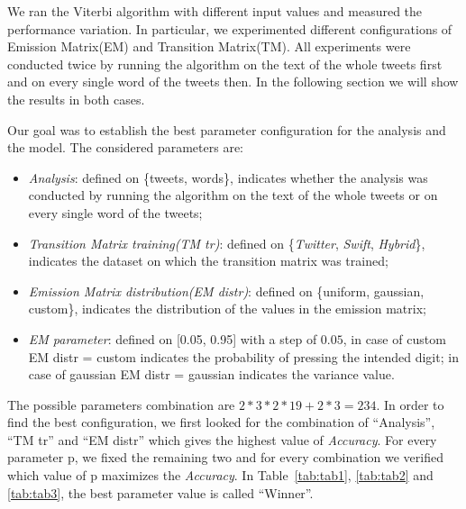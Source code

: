\documentclass[12pt]{article}
\begin{document}
We ran the Viterbi algorithm with different input values and measured the performance variation. In particular, we experimented different configurations
of Emission Matrix(EM) and Transition Matrix(TM). All experiments were conducted
twice by running the algorithm on the text of the whole tweets first and on
every single word of the tweets then. In the following section we will show the
results in both cases.

Our goal was to establish the best parameter configuration for the analysis and
the model. 
The considered parameters are: 
\begin{itemize}
  \item \emph{Analysis}: defined on \{tweets, words\}, indicates whether the
  analysis was conducted by running the algorithm on the text of the whole
  tweets or on every single word of the tweets;
  \item \emph{Transition Matrix training(TM tr)}: defined on \{\emph{Twitter},
  \emph{Swift}, \emph{Hybrid}\}, indicates the dataset on which the transition
  matrix was trained;
  \item \emph{Emission Matrix distribution(EM distr)}: defined on \{uniform,
  gaussian, custom\}, indicates the distribution of the values in the emission
  matrix;
  \item \emph{EM parameter}: defined on [0.05, 0.95] with a step of $0.05$,
  in case of custom EM distr = custom indicates the probability of pressing the
  intended digit; in case of gaussian EM distr = gaussian indicates the variance value.
\end{itemize}
The possible parameters combination are $2 * 3 * 2 * 19 + 2 * 3 = 234$. In order
to find the best configuration, we first looked for the combination of
``Analysis'', ``TM tr'' and ``EM  distr'' which gives the highest value of
\emph{Accuracy}. For every parameter p, we fixed the remaining two and for every
combination we verified which value of p maximizes the \emph{Accuracy}. In
Table~\ref{tab:tab1}, \ref{tab:tab2} and \ref{tab:tab3}, the best parameter value is called ``Winner''.
\end{document}

